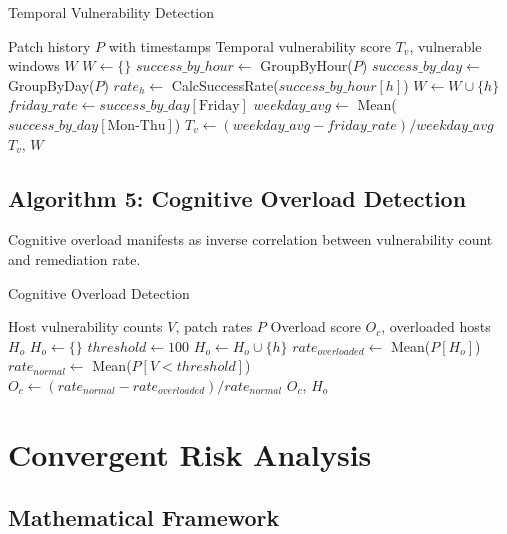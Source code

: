 \documentclass[11pt,a4paper]{article}
\begin{document}
\begin{algorithm}
\caption{Temporal Vulnerability Detection}
\label{alg:temporal}
\begin{algorithmic}[1]
\REQUIRE Patch history $P$ with timestamps
\ENSURE Temporal vulnerability score $T_v$, vulnerable windows $W$
\STATE $W \leftarrow \{\}$
\STATE $success\_by\_hour \leftarrow$ GroupByHour($P$)
\STATE $success\_by\_day \leftarrow$ GroupByDay($P$)
    \STATE $rate_h \leftarrow$ CalcSuccessRate($success\_by\_hour[h]$)
        \STATE $W \leftarrow W \cup \{h\}$
    \ENDIF
\ENDFOR
\STATE $friday\_rate \leftarrow success\_by\_day[\text{Friday}]$
\STATE $weekday\_avg \leftarrow$ Mean($success\_by\_day[\text{Mon-Thu}]$)
\STATE $T_v \leftarrow (weekday\_avg - friday\_rate) / weekday\_avg$
\RETURN $T_v$, $W$
\end{algorithmic}
\end{algorithm}

\subsection{Algorithm 5: Cognitive Overload Detection}

Cognitive overload manifests as inverse correlation between vulnerability count and remediation rate.

\begin{algorithm}
\caption{Cognitive Overload Detection}
\label{alg:cognitive}
\begin{algorithmic}[1]
\REQUIRE Host vulnerability counts $V$, patch rates $P$
\ENSURE Overload score $O_c$, overloaded hosts $H_o$
\STATE $H_o \leftarrow \{\}$
\STATE $threshold \leftarrow 100$ 
        \STATE $H_o \leftarrow H_o \cup \{h\}$
    \ENDIF
\ENDFOR
\STATE $rate_{overloaded} \leftarrow$ Mean($P[H_o]$)
\STATE $rate_{normal} \leftarrow$ Mean($P[V < threshold]$)
\STATE $O_c \leftarrow (rate_{normal} - rate_{overloaded}) / rate_{normal}$
\RETURN $O_c$, $H_o$
\end{algorithmic}
\end{algorithm}

\section{Convergent Risk Analysis}

\subsection{Mathematical Framework}
\end{document}
